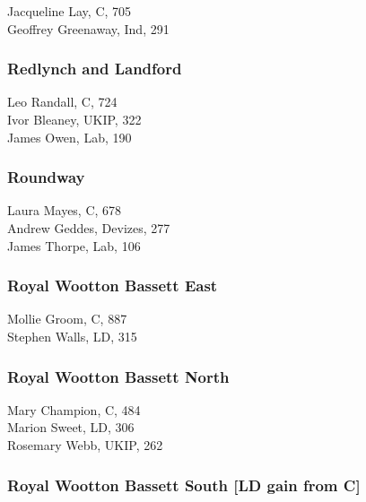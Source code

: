 \documentclass[a4paper,openany,10pt]{book}
\begin{document}
Jacqueline Lay, C, 705\\
Geoffrey Greenaway, Ind, 291\\


\subsubsection*{Redlynch and Landford}



Leo Randall, C, 724\\
Ivor Bleaney, UKIP, 322\\
James Owen, Lab, 190\\


\subsubsection*{Roundway}



Laura Mayes, C, 678\\
Andrew Geddes, Devizes, 277\\
James Thorpe, Lab, 106\\


\subsubsection*{Royal Wootton Bassett East}



Mollie Groom, C, 887\\
Stephen Walls, LD, 315\\


\subsubsection*{Royal Wootton Bassett North}



Mary Champion, C, 484\\
Marion Sweet, LD, 306\\
Rosemary Webb, UKIP, 262\\


\subsubsection*{Royal Wootton Bassett South \hspace*{\fill}\nolinebreak[1]%
\enspace\hspace*{\fill}
[LD gain from C]}
\end{document}
